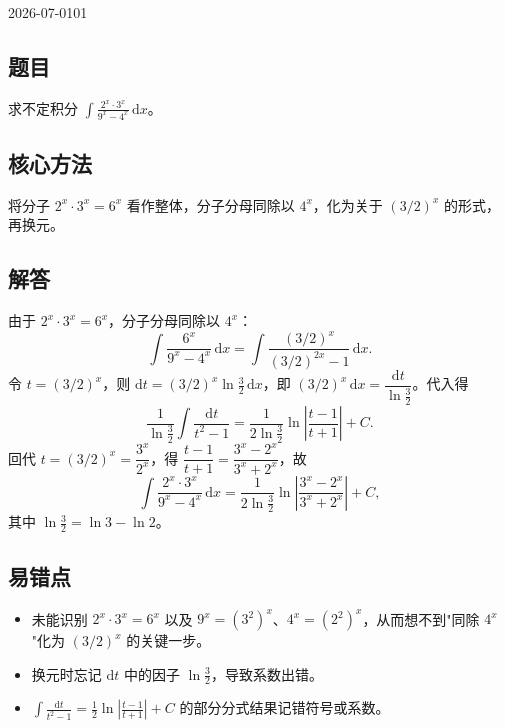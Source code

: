 \begin{mistake}{2026-07-01}{01}
\subsection*{题目}
求不定积分 $\displaystyle\int \frac{2^x \cdot 3^x}{9^x - 4^x}\,\mathrm{d}x$。

\subsection*{核心方法}
将分子 $2^x\cdot 3^x = 6^x$ 看作整体，分子分母同除以 $4^x$，化为关于 $(3/2)^x$ 的形式，再换元。

\subsection*{解答}
由于 $2^x\cdot 3^x = 6^x$，分子分母同除以 $4^x$：
\[
\int \frac{6^x}{9^x-4^x}\,\mathrm{d}x = \int \frac{(3/2)^x}{(3/2)^{2x}-1}\,\mathrm{d}x.
\]
令 $t=(3/2)^x$，则 $\mathrm{d}t = (3/2)^x \ln\frac32\,\mathrm{d}x$，即 $(3/2)^x\,\mathrm{d}x = \dfrac{\mathrm{d}t}{\ln\frac32}$。代入得
\[
\frac{1}{\ln\frac32}\int \frac{\mathrm{d}t}{t^2-1} = \frac{1}{2\ln\frac32}\ln\left|\frac{t-1}{t+1}\right| + C.
\]
回代 $t=(3/2)^x = \dfrac{3^x}{2^x}$，得 $\dfrac{t-1}{t+1}=\dfrac{3^x-2^x}{3^x+2^x}$，故
\[
\int \frac{2^x \cdot 3^x}{9^x - 4^x}\,\mathrm{d}x = \frac{1}{2\ln\frac32}\ln\left|\frac{3^x-2^x}{3^x+2^x}\right| + C,
\]
其中 $\ln\frac32 = \ln 3-\ln 2$。

\subsection*{易错点}
\begin{itemize}
\item 未能识别 $2^x\cdot 3^x = 6^x$ 以及 $9^x=(3^2)^x$、$4^x=(2^2)^x$，从而想不到"同除 $4^x$"化为 $(3/2)^x$ 的关键一步。
\item 换元时忘记 $\mathrm{d}t$ 中的因子 $\ln\frac32$，导致系数出错。
\item $\int\frac{\mathrm{d}t}{t^2-1}=\frac12\ln\left|\frac{t-1}{t+1}\right|+C$ 的部分分式结果记错符号或系数。
\end{itemize}
\end{mistake}
